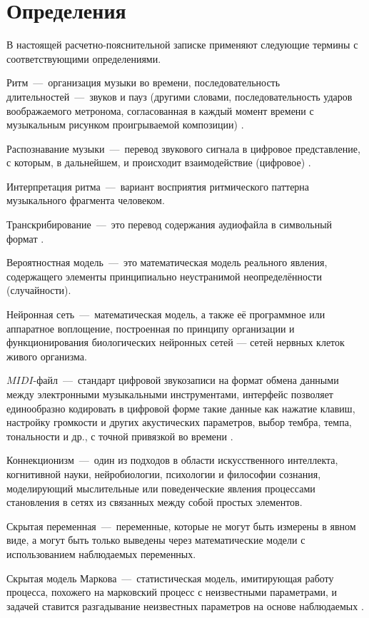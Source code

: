 \chapter*{Определения}
В настоящей расчетно-пояснительной записке применяют следующие термины с соответствующими определениями.

Ритм~---~организация музыки во времени, последовательность длительностей~---~звуков и пауз (другими словами, последовательность ударов воображаемого метронома, согласованная в каждый момент времени с музыкальным рисунком проигрываемой композиции) \cite{bib16}.

Распознавание музыки~---~перевод звукового сигнала в цифровое представление, с которым, в дальнейшем, и происходит взаимодействие (цифровое) \cite{bib18}.

Интерпретация ритма~---~вариант восприятия ритмического паттерна музыкального фрагмента человеком.

Транскрибирование~---~это перевод содержания аудиофайла в символьный формат \cite{bib20}.

Вероятностная модель~---~это математическая модель реального явления, содержащего элементы принципиально неустранимой неопределённости (случайности).

Нейронная сеть~---~математическая модель, а также её программное или аппаратное воплощение, построенная по принципу организации и функционирования биологических нейронных сетей — сетей нервных клеток живого организма.

$MIDI$-файл~---~стандарт цифровой звукозаписи на формат обмена данными между электронными музыкальными инструментами, интерфейс позволяет единообразно кодировать в цифровой форме такие данные как нажатие клавиш, настройку громкости и других акустических параметров, выбор тембра, темпа, тональности и др., с точной привязкой во времени \cite{bib21}.

Коннекционизм~---~один из подходов в области искусственного интеллекта, когнитивной науки, нейробиологии, психологии и философии сознания, моделирующий мыслительные или поведенческие явления процессами становления в сетях из связанных между собой простых элементов.

Скрытая переменная~---~переменные, которые не могут быть измерены в явном виде, а могут быть только выведены через математические модели с использованием наблюдаемых переменных.

Скрытая модель Маркова~---~статистическая модель, имитирующая работу процесса, похожего на марковский процесс с неизвестными параметрами, и задачей ставится разгадывание неизвестных параметров на основе наблюдаемых \cite{bib17}.

